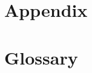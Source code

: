 \newpage


\chapter{Appendix}\label{sec:appendix}

\newpage


\chapter{Glossary}\label{sec:glossary}


\printglossary[type=\acronymtype]

\printglossary

\newpage


\printbibliography[heading=bibnumbered, title={Bibliography}]